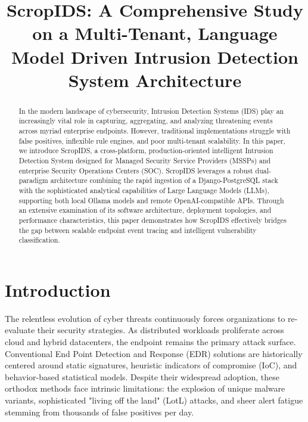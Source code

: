 \documentclass[10pt, conference]{IEEEtran}
\begin{document}
\title{ScropIDS: A Comprehensive Study on a Multi-Tenant, Language Model Driven Intrusion Detection System Architecture}

\author{
}

\maketitle

\begin{abstract}
In the modern landscape of cybersecurity, Intrusion Detection Systems (IDS) play an increasingly vital role in capturing, aggregating, and analyzing threatening events across myriad enterprise endpoints. However, traditional implementations struggle with false positives, inflexible rule engines, and poor multi-tenant scalability. In this paper, we introduce ScropIDS, a cross-platform, production-oriented intelligent Intrusion Detection System designed for Managed Security Service Providers (MSSPs) and enterprise Security Operations Centers (SOC). ScropIDS leverages a robust dual-paradigm architecture combining the rapid ingestion of a Django-PostgreSQL stack with the sophisticated analytical capabilities of Large Language Models (LLMs), supporting both local Ollama models and remote OpenAI-compatible APIs. Through an extensive examination of its software architecture, deployment topologies, and performance characteristics, this paper demonstrates how ScropIDS effectively bridges the gap between scalable endpoint event tracing and intelligent vulnerability classification.
\end{abstract}

\section{Introduction}
The relentless evolution of cyber threats continuously forces organizations to re-evaluate their security strategies. As distributed workloads proliferate across cloud and hybrid datacenters, the endpoint remains the primary attack surface. Conventional End Point Detection and Response (EDR) solutions are historically centered around static signatures, heuristic indicators of compromise (IoC), and behavior-based statistical models. Despite their widespread adoption, these orthodox methods face intrinsic limitations: the explosion of unique malware variants, sophisticated "living off the land" (LotL) attacks, and sheer alert fatigue stemming from thousands of false positives per day. 
\end{document}
